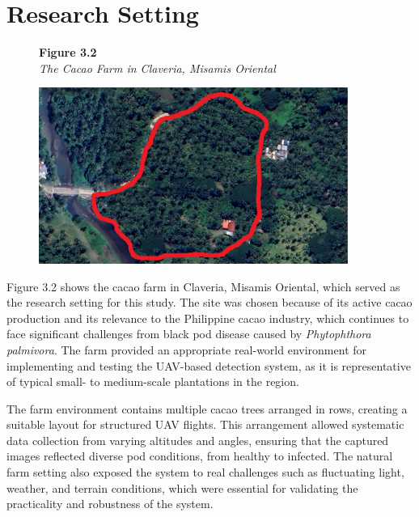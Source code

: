 	\section{Research Setting}
	
	\begin{figure}[H]
		\raggedright
		\textbf{Figure 3.2} \\ %
		\textit{The Cacao Farm in Claveria, Misamis Oriental} %
		
		\vspace{0.5em}
		\centering
		\includegraphics[width=0.9\textwidth]{figures/Cacao_Farm.pdf} %
		
		\vspace{0.5em}
		\raggedright
		
		\label{fig:cacao_farm}
	\end{figure}
	
	Figure 3.2 shows the cacao farm in Claveria, Misamis Oriental, which served as the research setting for this study. 
	The site was chosen because of its active cacao production and its relevance to the Philippine cacao industry, which continues to face significant challenges from black pod disease caused by \textit{Phytophthora palmivora}. 
	The farm provided an appropriate real-world environment for implementing and testing the UAV-based detection system, as it is representative of typical small- to medium-scale plantations in the region.  
	
	The farm environment contains multiple cacao trees arranged in rows, creating a suitable layout for structured UAV flights. 
	This arrangement allowed systematic data collection from varying altitudes and angles, ensuring that the captured images reflected diverse pod conditions, from healthy to infected. 
	The natural farm setting also exposed the system to real challenges such as fluctuating light, weather, and terrain conditions, which were essential for validating the practicality and robustness of the system.  
	
